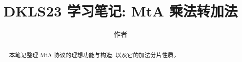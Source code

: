 \documentclass[11pt]{jmlr}
\title{DKLS23 学习笔记: MtA 乘法转加法}
\author{作者}
\begin{document}
\jmlrmaketitle

\begin{abstract}
本笔记整理 MtA 协议的理想功能与构造, 以及它的加法分片性质。
\end{abstract}


\end{document}
